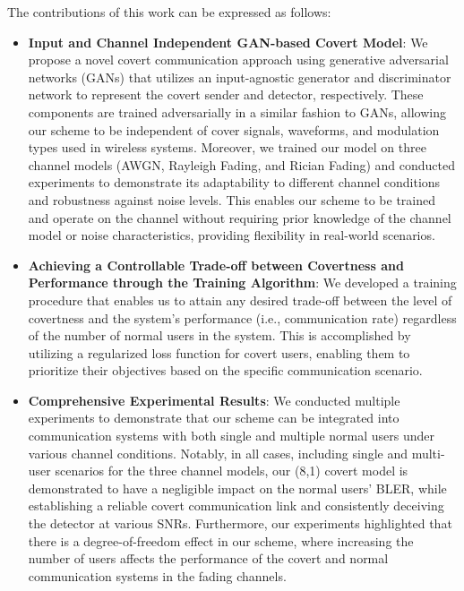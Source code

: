 The contributions of this work can be expressed as follows:
\begin{itemize}
	\item \textbf{Input and Channel Independent GAN-based Covert Model}: We propose a novel covert communication approach using generative adversarial networks (GANs) that utilizes an input-agnostic generator and discriminator network to represent the covert sender and detector, respectively. These components are trained adversarially in a similar fashion to GANs, allowing our scheme to be independent of cover signals, waveforms, and modulation types used in wireless systems. Moreover, we trained our model on three channel models (AWGN, Rayleigh Fading, and Rician Fading) and conducted experiments to demonstrate its adaptability to different channel conditions and robustness against noise levels. This enables our scheme to be trained and operate on the channel without requiring prior knowledge of the channel model or noise characteristics, providing flexibility in real-world scenarios.
	\item \textbf{Achieving a Controllable Trade-off between Covertness and Performance through the Training Algorithm}: We developed a training procedure that enables us to attain any desired trade-off between the level of covertness and the system's performance (i.e., communication rate) regardless of the number of normal users in the system. This is accomplished by utilizing a regularized loss function for covert users, enabling them to prioritize their objectives based on the specific communication scenario.
	\item \textbf{Comprehensive Experimental Results}: We conducted multiple experiments to demonstrate that our scheme can be integrated into communication systems with both single and multiple normal users under various channel conditions. Notably, in all cases, including single and multi-user scenarios for the three channel models, our (8,1) covert model is demonstrated to have a negligible impact on the normal users' BLER, while establishing a reliable covert communication link and consistently deceiving the detector at various SNRs. Furthermore, our experiments highlighted that there is a degree-of-freedom effect in our scheme, where increasing the number of users affects the performance of the covert and normal communication systems in the fading channels.
\end{itemize}

